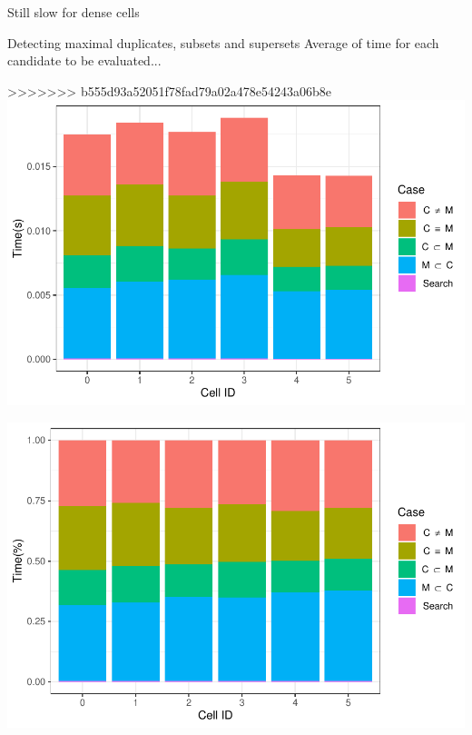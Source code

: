 \documentclass{beamer}
\begin{document}
\begin{frame}{Still slow for dense cells}
\begin{frame}{Detecting maximal duplicates, subsets and supersets}
        {Average of time for each candidate to be evaluated...}
        \centering
        \begin{minipage}{0.49\textwidth}
>>>>>>> b555d93a52051f78fad79a02a478e54243a06b8e
                \includegraphics[width=\textwidth]{figures/Maximals/performanceByMean1}
        \end{minipage} %
        \begin{minipage}{0.49\textwidth}
                \includegraphics[width=\textwidth]{figures/Maximals/performanceByMean2}
        \end{minipage}
\end{frame}


\end{frame}
\end{document}

